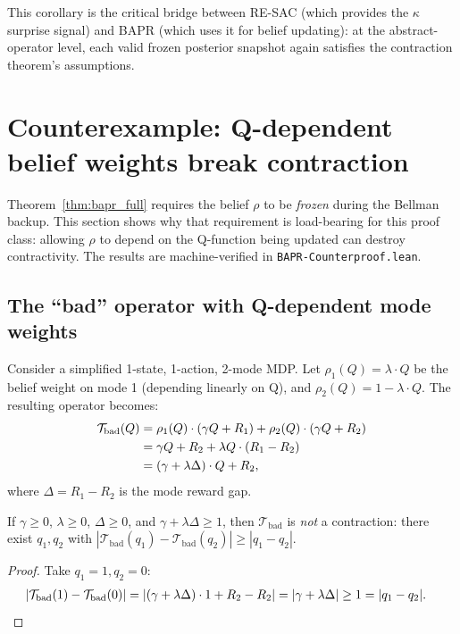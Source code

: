 \noindent This corollary is the critical bridge between RE-SAC (which provides the $\kappa$ surprise signal) and BAPR (which uses it for belief updating): at the abstract-operator level, each valid frozen posterior snapshot again satisfies the contraction theorem's assumptions.


\section{Counterexample: Q-dependent belief weights break contraction}
\label{app:counterproof}

Theorem~\ref{thm:bapr_full} requires the belief $\rho$ to be \emph{frozen} during the Bellman backup. This section shows why that requirement is load-bearing for this proof class: allowing $\rho$ to depend on the Q-function being updated can destroy contractivity. The results are machine-verified in \texttt{BAPR-Counterproof.lean}.

\subsection{The ``bad'' operator with Q-dependent mode weights}

Consider a simplified 1-state, 1-action, 2-mode MDP. Let $\rho_1(Q) = \lambda \cdot Q$ be the belief weight on mode 1 (depending linearly on Q), and $\rho_2(Q) = 1 - \lambda \cdot Q$. The resulting operator becomes:
\begin{align}
    \mathcal{T}_{\text{bad}}(Q) &= \rho_1(Q) \cdot (\gamma Q + R_1) + \rho_2(Q) \cdot (\gamma Q + R_2) \notag \\
    &= \gamma Q + R_2 + \lambda Q \cdot (R_1 - R_2) \notag \\
    &= (\gamma + \lambda \Delta) \cdot Q + R_2,
\end{align}
where $\Delta = R_1 - R_2$ is the mode reward gap.

\begin{theorem}
    \label{thm:counter}
    If $\gamma \geq 0$, $\lambda \geq 0$, $\Delta \geq 0$, and $\gamma + \lambda\Delta \geq 1$, then $\mathcal{T}_{\text{bad}}$ is \emph{not} a contraction: there exist $q_1, q_2$ with $|\mathcal{T}_{\text{bad}}(q_1) - \mathcal{T}_{\text{bad}}(q_2)| \geq |q_1 - q_2|$.
\end{theorem}
\begin{proof}
Take $q_1 = 1, q_2 = 0$:
\begin{align}
    |\mathcal{T}_{\text{bad}}(1) - \mathcal{T}_{\text{bad}}(0)| &= |(\gamma + \lambda\Delta) \cdot 1 + R_2 - R_2| = |\gamma + \lambda\Delta| \geq 1 = |q_1 - q_2|. \qedhere
\end{align}
\end{proof}

